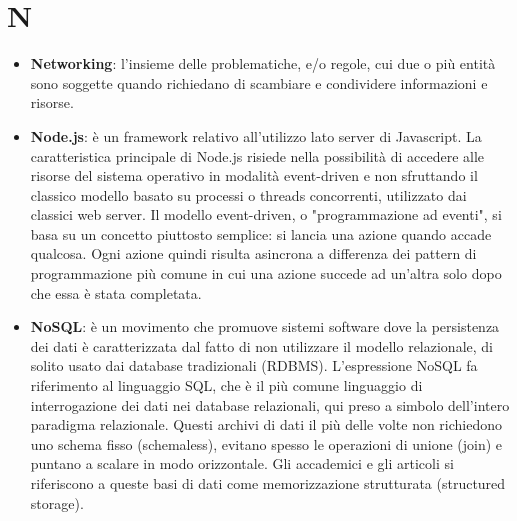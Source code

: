 \section{N}
\begin{itemize}
	\item
	\textbf{Networking}: l’insieme delle problematiche, e/o regole, cui due o più entità sono soggette quando richiedano di scambiare e condividere informazioni e risorse.  
	\item
	\textbf{Node.js}: è un framework relativo all'utilizzo lato server di Javascript.
	 La caratteristica principale di Node.js risiede nella possibilità di accedere alle risorse del sistema operativo in modalità event-driven e non sfruttando il classico modello basato su processi o threads concorrenti, utilizzato dai classici web server. Il modello event-driven, o "programmazione ad eventi", si basa su un concetto piuttosto semplice: si lancia una azione quando accade qualcosa. Ogni azione quindi risulta asincrona a differenza dei pattern di programmazione più comune in cui una azione succede ad un'altra solo dopo che essa è stata completata.
	 \item
	 \textbf{NoSQL}: è un movimento che promuove sistemi software dove la persistenza dei dati è caratterizzata dal fatto di non utilizzare il modello relazionale, di solito usato dai database tradizionali (RDBMS). L'espressione NoSQL fa riferimento al linguaggio SQL, che è il più comune linguaggio di interrogazione dei dati nei database relazionali, qui preso a simbolo dell'intero paradigma relazionale.
	 Questi archivi di dati il più delle volte non richiedono uno schema fisso (schemaless), evitano spesso le operazioni di unione (join) e puntano a scalare in modo orizzontale. Gli accademici e gli articoli si riferiscono a queste basi di dati come memorizzazione strutturata (structured storage).
\end{itemize}